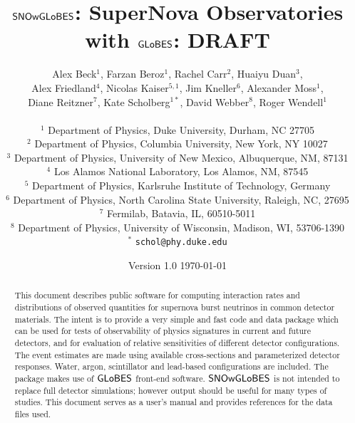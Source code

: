 \documentclass[12pt]{article}
\newcommand{\globes}{\sf{GLoBES}}
\newcommand{\snowglobes}{\sf{SNOwGLoBES}}
\begin{document}
\title{\bf $\snowglobes$: SuperNova Observatories with $\globes$: DRAFT}
\author{Alex Beck$^1$,
Farzan Beroz$^1$,
Rachel Carr$^2$,
Huaiyu Duan$^3$,\\
Alex Friedland$^4$,
Nicolas Kaiser$^{5,1}$,
Jim Kneller$^6$,
Alexander Moss$^1$,\\
Diane Reitzner$^7$,
Kate Scholberg$^{1*}$,
David Webber$^8$,
Roger Wendell$^1$\\
~\\
\small
$^1$ Department of Physics, Duke University, Durham, NC 27705\\
\small
$^2$ Department of Physics, Columbia University, New York, NY 10027\\
\small
$^3$ Department of Physics, University of New Mexico, Albuquerque, NM, 87131\\
\small
$^4$ Los Alamos National Laboratory, Los Alamos, NM, 87545\\
\small
$^5$ Department of Physics, Karlsruhe Institute of Technology, Germany\\
\small
$^6$ Department of Physics, North Carolina State University, Raleigh, NC,  27695\\
\small
$^7$ Fermilab, Batavia, IL, 60510-5011\\
\small
$^8$ Department of Physics, University of Wisconsin, Madison, WI, 53706-1390\\
\small
$^*$ \texttt{schol@phy.duke.edu}\\
}

\date{Version 1.0 \today}

\maketitle 


\begin{abstract} 
This document describes public software
  for computing interaction rates and distributions of observed
  quantities for supernova burst neutrinos in common detector
  materials.  The intent is to provide a very simple and fast 
  code and data
  package which
  can be used for tests of observability of physics signatures in
  current and future detectors, and for evaluation of relative
  sensitivities of different detector configurations.  The event
  estimates are made using available cross-sections and
  parameterized detector responses.  Water, argon, scintillator
  and lead-based configurations are included.
  The package makes use of $\globes$
  front-end software.  $\snowglobes$ is not intended to replace full
  detector simulations; however output should be useful for many types
  of studies.  This document serves as a user's manual and provides 
  references for the data files used.

\end{abstract}
\end{document}
